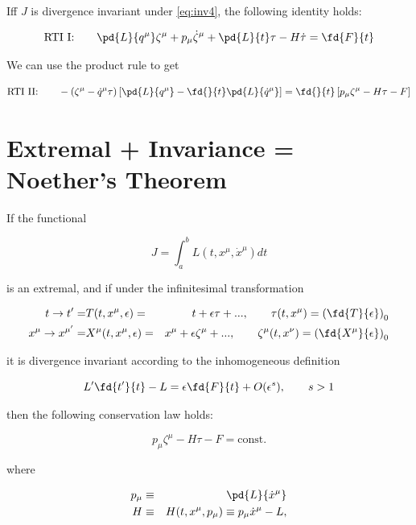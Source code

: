 \documentclass[12pt]{article}
\newcommand{\coord}{x}
\newcommand{\Coord}{X}
\newcommand{\xd}{\dot{\coord}}
\newcommand{\xmu}{\coord^\mu}
\newcommand{\xnu}{\coord^\nu}
\newcommand{\xmup}{\coord^{\mu{'}}}
\newcommand{\Xmu}{\Coord^\mu}
\newcommand{\xdmu}{\xd^\mu}
\newcommand{\pmu}{p_\mu}
\numberwithin{equation}{section}
\begin{document}
Iff $J$ is divergence invariant under \ref{eq:inv4}, the following identity holds:

\begin{equation}
  \label{eq:rti1inhom}
  \textrm{RTI I:}\qquad\pd{L}{q^\mu}\zeta^\mu + p_\mu\dot{\zeta}^\mu + \pd{L}{t}\tau - H\dot{\tau} = \fd{F}{t}
\end{equation}

We can use the product rule to get 

\begin{equation}
  \label{eq:rti2inhom}
  \textrm{RTI II:}\qquad-\left( \zeta^\mu - \dot{q}^\mu\tau \right)\left[ \pd{L}{q^\mu} - \fd{}{t}\pd{L}{\dot{q}^\mu}  \right]
    = \fd{}{t}\left[ p_\mu\zeta^\mu - H\tau  - F\right]
\end{equation}

\section{Extremal + Invariance = Noether's Theorem}

If the functional

\begin{equation*}
  J = \int_a^b L(t,\xmu,\xdmu)dt
\end{equation*}

is an extremal, and if under the infinitesimal transformation

\begin{eqnarray*}
  t \to t' = & T(t,\xmu,\epsilon) = & t + \epsilon\tau + ..., \qquad \tau(t,\xmu)=\left(\fd{T}{\epsilon}\right)_0\\
  \xmu \to \xmup = & \Xmu(t,\xmu,\epsilon) = & \xmu + \epsilon\zeta^\mu + ...,  \qquad \zeta^\mu(t,\xnu)=\left(\fd{\Xmu}{\epsilon}\right)_0\notag
\end{eqnarray*}

it is divergence invariant according to the inhomogeneous definition

\begin{equation*}
  L'\fd{t'}{t} - L  = \epsilon \fd{F}{t} + O(\epsilon^s) , \qquad s>1
\end{equation*}

then the following conservation law holds:

\begin{equation}
  p_\mu\zeta^\mu - H\tau - F = \textrm{const}.
\end{equation}

where

\begin{eqnarray*}
  \pmu &\equiv& \pd{L}{\xdmu} \\
  H &\equiv& H(t,\xmu,\pmu) \equiv \pmu\xdmu - L,
\end{eqnarray*}
\end{document}
